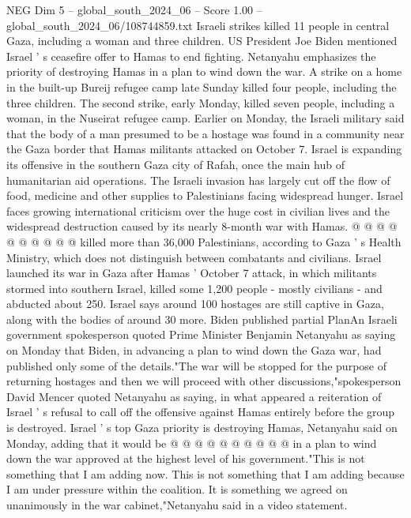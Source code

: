 \begin{textsample}{NEG Dim 5 – global\_south\_2024\_06 – Score 1.00 – global\_south\_2024\_06/108744859.txt}  \label{ex:f5_neg_230}
Israeli strikes killed 11 people in central Gaza, including a woman and three children.
US President Joe Biden mentioned Israel ' s ceasefire offer to Hamas to end fighting.
Netanyahu emphasizes the priority of destroying Hamas in a plan to wind down the war.
A strike on a home in the built-up Bureij refugee camp late Sunday killed four people, including the three children.
The second strike, early Monday, killed seven people, including a woman, in the Nuseirat refugee camp.
Earlier on Monday, the Israeli military said that the body of a man presumed to be a hostage was found in a community near the Gaza border that Hamas militants attacked on October 7.
Israel is expanding its offensive in the southern Gaza city of Rafah, once the main hub of humanitarian aid operations.
The Israeli invasion has largely cut off the flow of food, medicine and other supplies to Palestinians facing widespread hunger.
Israel faces growing international criticism over the huge cost in civilian lives and the widespread destruction caused by its nearly 8-month war with Hamas. @ @ @ @ @ @ @ @ @ @ killed more than 36,000 Palestinians, according to Gaza ' s Health Ministry, which does not distinguish between combatants and civilians.
Israel launched its war in Gaza after Hamas ' October 7 attack, in which militants stormed into southern Israel, killed some 1,200 people - mostly civilians - and abducted about 250.
Israel says around 100 hostages are still captive in Gaza, along with the bodies of around 30 more.
Biden published partial PlanAn Israeli government spokesperson quoted Prime Minister Benjamin Netanyahu as saying on Monday that Biden, in advancing a plan to wind down the Gaza war, had published only some of the details."The war will be stopped for the purpose of returning hostages and then we will proceed with other discussions,"spokesperson David Mencer quoted Netanyahu as saying, in what appeared a reiteration of Israel ' s refusal to call off the offensive against Hamas entirely before the group is destroyed.
Israel ' s top Gaza priority is destroying Hamas, Netanyahu said on Monday, adding that it would be @ @ @ @ @ @ @ @ @ @ in a plan to wind down the war approved at the highest level of his government."This is not something that I am adding now.
This is not something that I am adding because I am under pressure within the coalition.
It is something we agreed on unanimously in the war cabinet,"Netanyahu said in a video statement.

\end{textsample}

